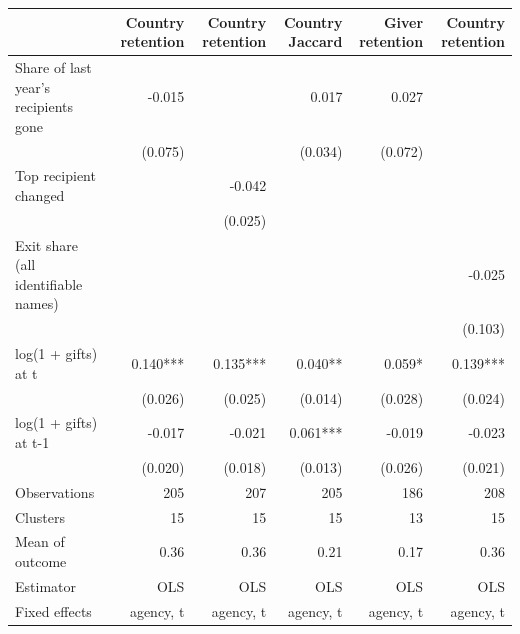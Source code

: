 \begin{tabular}{lrrrrr}
\toprule
 & Country retention & Country retention & Country Jaccard & Giver retention & Country retention \\
\midrule
Share of last year's recipients gone & -0.015 &  & 0.017 & 0.027 &  \\
 & (0.075) &  & (0.034) & (0.072) &  \\
Top recipient changed &  & -0.042 &  &  &  \\
 &  & (0.025) &  &  &  \\
Exit share (all identifiable names) &  &  &  &  & -0.025 \\
 &  &  &  &  & (0.103) \\
log(1 + gifts) at t & 0.140*** & 0.135*** & 0.040** & 0.059* & 0.139*** \\
 & (0.026) & (0.025) & (0.014) & (0.028) & (0.024) \\
log(1 + gifts) at t-1 & -0.017 & -0.021 & 0.061*** & -0.019 & -0.023 \\
 & (0.020) & (0.018) & (0.013) & (0.026) & (0.021) \\
Observations & 205 & 207 & 205 & 186 & 208 \\
Clusters & 15 & 15 & 15 & 13 & 15 \\
Mean of outcome & 0.36 & 0.36 & 0.21 & 0.17 & 0.36 \\
Estimator & OLS & OLS & OLS & OLS & OLS \\
Fixed effects & agency, t & agency, t & agency, t & agency, t & agency, t \\
\bottomrule
\end{tabular}
\par{}
